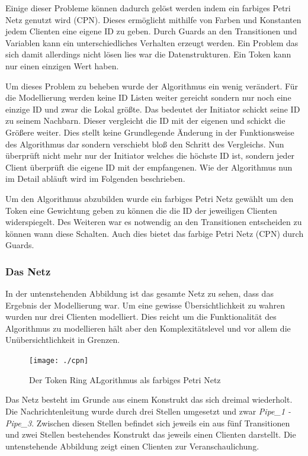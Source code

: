Einige dieser Probleme können dadurch gelöst werden indem ein farbiges Petri Netz genutzt wird (CPN). Dieses ermöglicht mithilfe von Farben und Konstanten jedem Clienten eine eigene ID zu geben. Durch Guards an den Transitionen und Variablen kann ein unterschiedliches Verhalten erzeugt werden. Ein Problem das sich damit allerdings nicht lösen lies war die Datenstrukturen. Ein Token kann nur einen einzigen Wert haben.

Um dieses Problem zu beheben wurde der Algorithmus ein wenig verändert. Für die Modellierung werden keine ID Listen weiter gereicht sondern nur noch eine einzige ID und zwar die Lokal größte. Das bedeutet der Initiator schickt seine ID zu seinem Nachbarn. Dieser vergleicht die ID mit der eigenen und schickt die Größere weiter. Dies stellt keine Grundlegende Änderung in der Funktionsweise des Algorithmus dar sondern verschiebt bloß den Schritt des Vergleichs. Nun überprüft nicht mehr nur der Initiator welches die höchste ID ist, sondern jeder Client überprüft die eigene ID mit der empfangenen. Wie der Algorithmus nun im Detail abläuft wird im Folgenden beschrieben.

Um den Algorithmus abzubilden wurde ein farbiges Petri Netz gewählt um den Token eine Gewichtung geben zu können die die ID der jeweiligen Clienten widerspiegelt. Des Weiteren war es notwendig an den Transitionen entscheiden zu können wann diese Schalten. Auch dies bietet das farbige Petri Netz (CPN) durch Guards.



\subsubsection{Das Netz}
In der untenstehenden Abbildung ist das gesamte Netz zu sehen, dass das Ergebnis der Modellierung war. Um eine gewisse Übersichtlichkeit zu wahren wurden nur drei Clienten modelliert. Dies reicht um die Funktionalität des Algorithmus zu modellieren hält aber den Komplexitätslevel und vor allem die Unübersichtlichkeit in Grenzen. 


\begin{figure}[H]
\centering
\texttt{[image: ./cpn]}
\caption{Der Token Ring ALgorithmus als farbiges Petri Netz}
\label{fig:cpn}
\end{figure}

Das Netz besteht im Grunde aus einem Konstrukt das sich dreimal wiederholt. Die Nachrichtenleitung wurde durch drei Stellen umgesetzt und zwar \textit{Pipe_1 - Pipe_3}. Zwischen diesen Stellen befindet sich jeweils ein aus fünf Transitionen und zwei Stellen bestehendes Konstrukt das jeweils einen Clienten darstellt. Die untenstehende Abbildung zeigt einen Clienten zur Veranschaulichung. 

